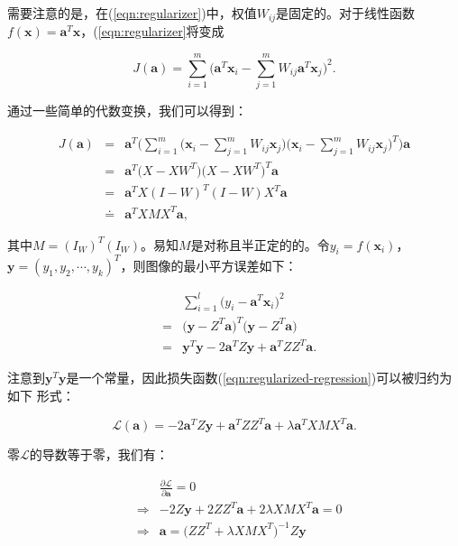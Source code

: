 需要注意的是，在(\ref{eqn:regularizer})中，权值$W_{ij}$是固定的。对于线性函数$f(\textbf{x})=\textbf{a}^T
\textbf{x}$，(\ref{eqn:regularizer}将变成

\begin{equation}\label{eqn:linear-regularizer}
    J(\mathbf{a})=\sum_{i=1}^{m} \Big( \mathbf{a}^T \mathbf{x}_i -
    \sum_{j=1}^{m} W_{ij} \mathbf{a}^T \mathbf{x}_j \Big)^2.
\end{equation}

通过一些简单的代数变换，我们可以得到：

\begin{eqnarray*}
J(\mathbf{a})&=&\textbf{a}^T \Big( \sum_{i=1}^m \big( \mathbf{x}_i -
\sum_{j=1}^{m} W_{ij} \mathbf{x}_j\big) \big( \mathbf{x}_i -
\sum_{j=1}^{m} W_{ij} \mathbf{x}_j \big)^T \Big) \textbf{a}\\
&=&\textbf{a}^T \big(X-XW^T \big) \big(X-XW^T \big)^T
\textbf{a}\\
   &=& \mathbf{a}^T X(I-W)^T(I-W)X^T \mathbf{a}\\
   &\doteq& \mathbf{a}^T XMX^T \mathbf{a},
\end{eqnarray*}

其中$M=(I_W)^T(I_W)$。易知$M$是对称且半正定的的。令$y_i=f(\mathbf{x}_i)$，$\mathbf{y}
= (y_1, y_2, \cdots, y_k)^T$，则图像的最小平方误差如下：

\begin{eqnarray*}
&& \sum_{i=1}^l \Big( y_i - \mathbf{a}^T \mathbf{x}_i \Big)^2\\
&=& \Big( \mathbf{y}-Z^T \mathbf{a}\Big)^T \Big( \mathbf{y}-Z^T \mathbf{a}\Big) \\
&=& \mathbf{y}^T \mathbf{y}-2\mathbf{a}^T Z\mathbf{y}+\mathbf{a}^T
ZZ^T \mathbf{a}.
\end{eqnarray*}

注意到$\mathbf{y}^T
\mathbf{y}$是一个常量，因此损失函数(\ref{eqn:regularized-regression})可以被归约为如下
形式：

\begin{equation}\label{eqn:final-loss-function}
    \mathcal{L}(\mathbf{a})= -2\mathbf{a}^T Z\mathbf{y}+\mathbf{a}^T ZZ^T \mathbf{a}
    + \lambda \mathbf{a}^T XMX^T \mathbf{a}.
\end{equation}

零$\mathcal{L}$的导数等于零，我们有：

\begin{eqnarray}
&& \frac{\partial \mathcal{L}}{\partial \mathbf{a}} =0 \nonumber \\
 &\Rightarrow& -2Z\mathbf{y}+2ZZ^T \mathbf{a}
    + 2\lambda XMX^T \mathbf{a}=0 \nonumber \\
 &\Rightarrow& \mathbf{a}=\Big( ZZ^T + \lambda XMX^T \Big)^{-1}Z\mathbf{y}
 \label{eqn:sol}
\end{eqnarray}

